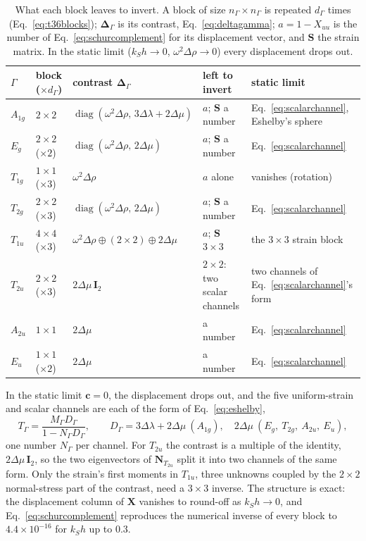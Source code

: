 \documentclass[11pt,a4paper]{article}
\newcommand{\bN}{\mathbf{N}}
\newcommand{\bI}{\mathbf{I}}
\newcommand{\bD}{\boldsymbol{\Delta}}
\begin{document}
\begin{table}[htbp]
\centering
\caption{What each block leaves to invert. A block of size $n_\Gamma\times n_\Gamma$ is repeated $d_\Gamma$
times (Eq.~\eqref{eq:t36blocks}); $\bD_\Gamma$ is its contrast, Eq.~\eqref{eq:deltagamma}; $a=1-X_{uu}$ is
the number of Eq.~\eqref{eq:schurcomplement} for its displacement vector, and $\mathbf S$ the strain matrix.
In the static limit ($k_Sh\to0$, $\omega^2\Delta\rho\to0$) every displacement drops out.}\label{tab:inverse}
\small
\begin{tabular}{@{}llllp{3.9cm}@{}}
\toprule
$\Gamma$ & block ($\times d_\Gamma$) & contrast $\bD_\Gamma$ & left to invert & static limit \\
\midrule
$A_{1g}$ & $2\times2$ & $\operatorname{diag}(\omega^2\Delta\rho,\,3\Delta\lambda+2\Delta\mu)$ & $a$; $\mathbf S$ a number &
Eq.~\eqref{eq:scalarchannel}, Eshelby's sphere \\
$E_g$ & $2\times2$ ($\times2$) & $\operatorname{diag}(\omega^2\Delta\rho,\,2\Delta\mu)$ & $a$; $\mathbf S$ a number &
Eq.~\eqref{eq:scalarchannel} \\
$T_{1g}$ & $1\times1$ ($\times3$) & $\omega^2\Delta\rho$ & $a$ alone & vanishes (rotation) \\
$T_{2g}$ & $2\times2$ ($\times3$) & $\operatorname{diag}(\omega^2\Delta\rho,\,2\Delta\mu)$ & $a$; $\mathbf S$ a number &
Eq.~\eqref{eq:scalarchannel} \\
$T_{1u}$ & $4\times4$ ($\times3$) & $\omega^2\Delta\rho\oplus(2\times2)\oplus2\Delta\mu$ & $a$; $\mathbf S$ $3\times3$ &
the $3\times3$ strain block \\
$T_{2u}$ & $2\times2$ ($\times3$) & $2\Delta\mu\,\bI_2$ & $2\times2$: two scalar channels &
two channels of Eq.~\eqref{eq:scalarchannel}'s form \\
$A_{2u}$ & $1\times1$ & $2\Delta\mu$ & a number & Eq.~\eqref{eq:scalarchannel} \\
$E_u$ & $1\times1$ ($\times2$) & $2\Delta\mu$ & a number & Eq.~\eqref{eq:scalarchannel} \\
\bottomrule
\end{tabular}
\end{table} In the static limit
$\mathbf c=0$, the displacement drops out, and the five uniform-strain and scalar channels are each of the
form of Eq.~\eqref{eq:eshelby},
\begin{equation}\label{eq:scalarchannel}
  T_\Gamma=\frac{M_\Gamma D_\Gamma}{1-N_\Gamma D_\Gamma},\qquad
  D_\Gamma=3\Delta\lambda+2\Delta\mu\ (A_{1g}),\quad 2\Delta\mu\ (E_g,\ T_{2g},\ A_{2u},\ E_u),
\end{equation}
one number $N_\Gamma$ per channel. For $T_{2u}$ the contrast is a multiple of the identity, $2\Delta\mu\,\bI_2$,
so the two eigenvectors of $\bN_{T_{2u}}$ split it into two channels of the same form. Only the strain's
first moments in $T_{1u}$, three unknowns coupled by the $2\times2$ normal-stress part of the contrast,
need a $3\times3$ inverse. The structure is exact: the displacement column of $\mathbf X$ vanishes to
round-off as $k_Sh\to0$, and Eq.~\eqref{eq:schurcomplement} reproduces the numerical inverse of every block
to $4.4\times10^{-16}$ for $k_Sh$ up to $0.3$.
\end{document}
